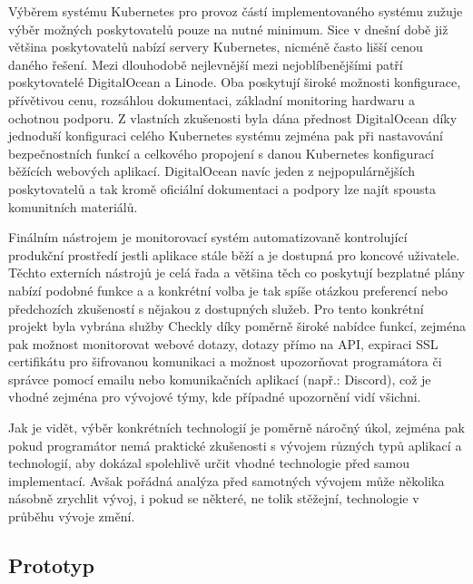 \begin{itemize}
\begin{itemize}
			Výběrem systému Kubernetes pro provoz částí implementovaného systému zužuje výběr možných poskytovatelů pouze na
			nutné minimum.
			Sice v dnešní době již většina poskytovatelů nabízí servery Kubernetes, nicméně často lišší cenou daného řešení.
			Mezi dlouhodobě nejlevnější mezi nejoblíbenějšími patří poskytovatelé DigitalOcean a Linode.
			Oba poskytují široké možnosti konfigurace, přívětivou cenu, rozsáhlou dokumentaci, základní monitoring hardwaru
			a ochotnou podporu.
			Z vlastních zkušenosti byla dána přednost DigitalOcean díky jednoduší konfiguraci celého Kubernetes systému
			zejména pak při nastavování bezpečnostních funkcí a celkového propojení s danou Kubernetes konfigurací běžících
			webových aplikací.
			DigitalOcean navíc jeden z nejpopulárnějších poskytovatelů a tak kromě oficiální dokumentaci a podpory lze
			najít spousta komunitních materiálů.

			Finálním nástrojem je monitorovací systém automatizovaně kontrolující produkční prostředí jestli aplikace
			stále běží a je dostupná pro koncové uživatele.
			Těchto externích nástrojů je celá řada a většina těch co poskytují bezplatné plány nabízí podobné funkce a
			a konkrétní volba je tak spíše otázkou preferencí nebo předchozích zkušeností s nějakou z dostupných služeb.
			Pro tento konkrétní projekt byla vybrána služby Checkly díky poměrně široké nabídce funkcí, zejména pak
			možnost monitorovat webové dotazy, dotazy přímo na \ac{API}, expiraci SSL certifikátu pro šifrovanou
			komunikaci a možnost upozorňovat programátora či správce pomocí emailu nebo komunikačních aplikací
			(např.: Discord), což je vhodné zejména pro vývojové týmy, kde případné upozornění vidí všichni.

	Jak je vidět, výběr konkrétních technologií je poměrně náročný úkol, zejména pak pokud programátor nemá praktické
	zkušenosti s vývojem různých typů aplikací a technologií, aby dokázal spolehlivě určit vhodné technologie před samou
	implementací.
	Avšak pořádná analýza před samotných vývojem může několika násobně zrychlit vývoj, i pokud se některé, ne tolik
	stěžejní, technologie v průběhu vývoje změní.

	\subsection{Prototyp}


\end{itemize}
\end{itemize}
